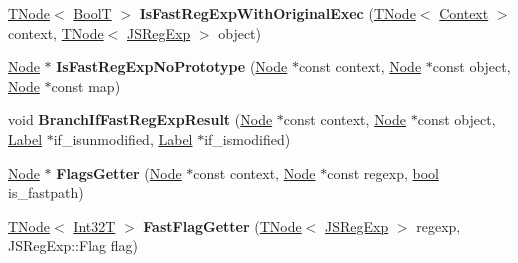 \begin{DoxyCompactItemize}
\mbox{\hyperlink{classv8_1_1internal_1_1compiler_1_1TNode}{T\+Node}}$<$ \mbox{\hyperlink{structv8_1_1internal_1_1BoolT}{BoolT}} $>$ {\bfseries Is\+Fast\+Reg\+Exp\+With\+Original\+Exec} (\mbox{\hyperlink{classv8_1_1internal_1_1compiler_1_1TNode}{T\+Node}}$<$ \mbox{\hyperlink{classv8_1_1internal_1_1Context}{Context}} $>$ context, \mbox{\hyperlink{classv8_1_1internal_1_1compiler_1_1TNode}{T\+Node}}$<$ \mbox{\hyperlink{classv8_1_1internal_1_1JSRegExp}{J\+S\+Reg\+Exp}} $>$ object)
\item 
\mbox{\label{classv8_1_1internal_1_1RegExpBuiltinsAssembler_a8ad008c1cbdc10d690de49a5dcb44c26}} 
\mbox{\hyperlink{classv8_1_1internal_1_1compiler_1_1Node}{Node}} $\ast$ {\bfseries Is\+Fast\+Reg\+Exp\+No\+Prototype} (\mbox{\hyperlink{classv8_1_1internal_1_1compiler_1_1Node}{Node}} $\ast$const context, \mbox{\hyperlink{classv8_1_1internal_1_1compiler_1_1Node}{Node}} $\ast$const object, \mbox{\hyperlink{classv8_1_1internal_1_1compiler_1_1Node}{Node}} $\ast$const map)
\item 
\mbox{\label{classv8_1_1internal_1_1RegExpBuiltinsAssembler_aa7750abcfeed9d2f1f4c1d8848139a22}} 
void {\bfseries Branch\+If\+Fast\+Reg\+Exp\+Result} (\mbox{\hyperlink{classv8_1_1internal_1_1compiler_1_1Node}{Node}} $\ast$const context, \mbox{\hyperlink{classv8_1_1internal_1_1compiler_1_1Node}{Node}} $\ast$const object, \mbox{\hyperlink{classv8_1_1internal_1_1compiler_1_1CodeAssemblerLabel}{Label}} $\ast$if\+\_\+isunmodified, \mbox{\hyperlink{classv8_1_1internal_1_1compiler_1_1CodeAssemblerLabel}{Label}} $\ast$if\+\_\+ismodified)
\item 
\mbox{\label{classv8_1_1internal_1_1RegExpBuiltinsAssembler_a1707b695ef54a2548f15522b013a8090}} 
\mbox{\hyperlink{classv8_1_1internal_1_1compiler_1_1Node}{Node}} $\ast$ {\bfseries Flags\+Getter} (\mbox{\hyperlink{classv8_1_1internal_1_1compiler_1_1Node}{Node}} $\ast$const context, \mbox{\hyperlink{classv8_1_1internal_1_1compiler_1_1Node}{Node}} $\ast$const regexp, \mbox{\hyperlink{classbool}{bool}} is\+\_\+fastpath)
\item 
\mbox{\label{classv8_1_1internal_1_1RegExpBuiltinsAssembler_a8ef9b50b26c78abc37b4ad9b5bc50245}} 
\mbox{\hyperlink{classv8_1_1internal_1_1compiler_1_1TNode}{T\+Node}}$<$ \mbox{\hyperlink{structv8_1_1internal_1_1Int32T}{Int32T}} $>$ {\bfseries Fast\+Flag\+Getter} (\mbox{\hyperlink{classv8_1_1internal_1_1compiler_1_1TNode}{T\+Node}}$<$ \mbox{\hyperlink{classv8_1_1internal_1_1JSRegExp}{J\+S\+Reg\+Exp}} $>$ regexp, J\+S\+Reg\+Exp\+::\+Flag flag)

\end{DoxyCompactItemize}

